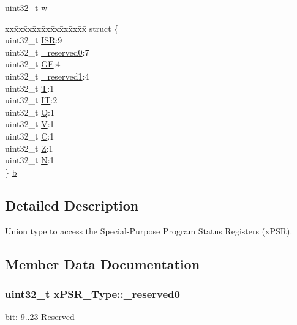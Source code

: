 \begin{DoxyCompactItemize}
\begin{tabbing}
\end{tabbing}\item 
uint32\-\_\-t \hyperlink{unionx_p_s_r___type_a1a47176768f45f79076c4f5b1b534bc2}{w}
\item 
\begin{tabbing}
xx\=xx\=xx\=xx\=xx\=xx\=xx\=xx\=xx\=\kill
struct \{\\
\>uint32\_t \hyperlink{unionx_p_s_r___type_a3e9120dcf1a829fc8d2302b4d0673970}{ISR}:9\\
\>uint32\_t \hyperlink{unionx_p_s_r___type_af438e0f407357e914a70b5bd4d6a97c5}{\_reserved0}:7\\
\>uint32\_t \hyperlink{unionx_p_s_r___type_a2d0ec4ccae337c1df5658f8cf4632e76}{GE}:4\\
\>uint32\_t \hyperlink{unionx_p_s_r___type_a790056bb6f20ea16cecc784b0dd19ad6}{\_reserved1}:4\\
\>uint32\_t \hyperlink{unionx_p_s_r___type_a7eed9fe24ae8d354cd76ae1c1110a658}{T}:1\\
\>uint32\_t \hyperlink{unionx_p_s_r___type_a3200966922a194d84425e2807a7f1328}{IT}:2\\
\>uint32\_t \hyperlink{unionx_p_s_r___type_add7cbd2b0abd8954d62cd7831796ac7c}{Q}:1\\
\>uint32\_t \hyperlink{unionx_p_s_r___type_af14df16ea0690070c45b95f2116b7a0a}{V}:1\\
\>uint32\_t \hyperlink{unionx_p_s_r___type_a40213a6b5620410cac83b0d89564609d}{C}:1\\
\>uint32\_t \hyperlink{unionx_p_s_r___type_a1e5d9801013d5146f2e02d9b7b3da562}{Z}:1\\
\>uint32\_t \hyperlink{unionx_p_s_r___type_a2db9a52f6d42809627d1a7a607c5dbc5}{N}:1\\
\} \hyperlink{unionx_p_s_r___type_a42867881c11d9d77ff171fff21744af7}{b}\\

\end{tabbing}\end{DoxyCompactItemize}


\subsection{Detailed Description}
Union type to access the Special-\/\-Purpose Program Status Registers (x\-P\-S\-R). 

\subsection{Member Data Documentation}
\hypertarget{unionx_p_s_r___type_af438e0f407357e914a70b5bd4d6a97c5}{
\subsubsection[{\-\_\-reserved0}]{\setlength{\rightskip}{0pt plus 5cm}uint32\-\_\-t x\-P\-S\-R\-\_\-\-Type\-::\-\_\-reserved0}}\label{unionx_p_s_r___type_af438e0f407357e914a70b5bd4d6a97c5}
bit\-: 9..23 Reserved

